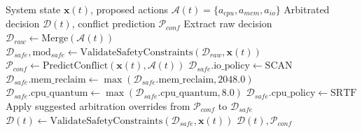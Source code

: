 \documentclass[conference]{IEEEtran}
\begin{document}
\begin{algorithm}[!t]
\caption{CoReOS Cross-Resource Arbitration and Coordination}
\label{alg:arbitration}
\begin{algorithmic}[1]
\REQUIRE System state $\mathbf{x}(t)$, proposed actions $\mathcal{A}(t) = \{a_{cpu}, a_{mem}, a_{io}\}$
\ENSURE Arbitrated decision $\mathcal{D}(t)$, conflict prediction $\mathcal{P}_{conf}$
\STATE Extract raw decision $\mathcal{D}_{raw} \leftarrow \text{Merge}(\mathcal{A}(t))$
\STATE $\mathcal{D}_{safe}, \text{mod}_{safe} \leftarrow \text{ValidateSafetyConstraints}(\mathcal{D}_{raw}, \mathbf{x}(t))$
\STATE $\mathcal{P}_{conf} \leftarrow \text{PredictConflict}(\mathbf{x}(t), \mathcal{A}(t))$
    \STATE $\mathcal{D}_{safe}.\text{io\_policy} \leftarrow \text{SCAN}$ 
\ENDIF
{}
    \STATE $\mathcal{D}_{safe}.\text{mem\_reclaim} \leftarrow \max(\mathcal{D}_{safe}.\text{mem\_reclaim}, 2048.0)$
    \STATE $\mathcal{D}_{safe}.\text{cpu\_quantum} \leftarrow \max(\mathcal{D}_{safe}.\text{cpu\_quantum}, 8.0)$
        \STATE $\mathcal{D}_{safe}.\text{cpu\_policy} \leftarrow \text{SRTF}$ 
    \ENDIF
\ENDIF
{}
    \STATE Apply suggested arbitration overrides from $\mathcal{P}_{conf}$ to $\mathcal{D}_{safe}$
\ENDIF
\STATE $\mathcal{D}(t) \leftarrow \text{ValidateSafetyConstraints}(\mathcal{D}_{safe}, \mathbf{x}(t))$
\RETURN $\mathcal{D}(t), \mathcal{P}_{conf}$
\end{algorithmic}
\end{algorithm}
\end{document}

